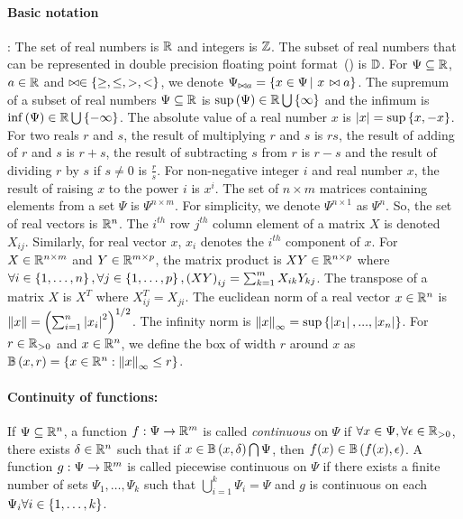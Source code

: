\paragraph{Basic notation}:  The set of real numbers is $\mathbb{R}$
and integers is $\mathbb{Z}$.  The subset of real
numbers that can be represented in double precision floating point
format~() is $\mathbb{D}$.  For $\Psi\subseteq\mathbb{R}$, $a\in\mathbb{R}$
and $\bowtie\in\left\{\geq,\leq,>,<\right\}$, we denote $\Psi_{\bowtie a}
= \left\{ x\in\Psi \left|~x\right. \bowtie a \right\}$.  The supremum of a subset of real
numbers $\Psi\subseteq\mathbb{R}$ is
$\sup\left(\Psi\right)\in\mathbb{R}\bigcup\left\{\infty\right\}$ and the infimum is
$\inf\left(\Psi\right)\in\mathbb{R}\bigcup\left\{-\infty\right\}$.  The absolute value of a
real number $x$ is $\left|x\right| = \sup\left\{x,-x\right\}$.  For two reals $r$ and
$s$, the result of multiplying $r$ and $s$ is $rs$, the result of
adding of $r$ and $s$ is $r+s$, the result of subtracting $s$ from $r$
is $r-s$ and the result of dividing $r$ by $s$ if $s\neq 0$ is
$\frac{r}{s}$.  For non-negative integer $i$ and real number $x$, the
result of raising $x$ to the power $i$ is $x^i$.  The set of $n\times
m$ matrices containing elements from a set $\Psi$ is $\Psi^{n\times
m}$.  For simplicity, we denote $\Psi^{n\times 1}$ as $\Psi^n$.  So,
the set of real vectors is $\mathbb{R}^n$. The $i^{th}$ row $j^{th}$
column element of a matrix $X$ is denoted $X_{ij}$.  Similarly, for
real vector $x$, $x_i$ denotes the $i^{th}$ component of $x$.  For
$X\in\mathbb{R}^{n\times m}$ and $Y\in\mathbb{R}^{m\times p}$, the matrix
product is $XY\in\mathbb{R}^{n\times p}$ where $\forall
i\in\left\{1,\ldots,n\right\},\forall j\in\left\{1,\ldots,p\right\},\left(XY\right)_{ij}
= \sum_{k=1}^{m}X_{ik}Y_{kj}$.  The transpose of a matrix $X$ is $X^T$
where $X^T_{ij} = X_{ji}$.  The euclidean norm of a real vector
$x\in\mathbb{R}^n$ is $\left\|x\right\| = \left(\sum_{i=1}^n\left|x_i\right|^2\right)^{1/2}$.
The infinity norm is $\left\|x\right\|_\infty
= \sup\left\{\left|x_1\right|,...,\left|x_n\right|\right\}$.  For $r\in\mathbb{R}_{> 0}$ and
$x\in\mathbb{R}^n$, we define the box of width $r$ around $x$ as
$\mathbb{B}\left(x,r\right) = \left\{ x\in\mathbb{R}^n: \left\|x\right\|_\infty \leq r \right\}$.
%
\paragraph{Continuity of functions:} If $\Psi\subseteq\mathbb{R}^n$, a
function $f:\Psi\rightarrow\mathbb{R}^m$ is called \emph{continuous} on
$\Psi$ if $\forall x\in\Psi,\forall\epsilon\in\mathbb{R}_{>0}$, there
exists $\delta\in\mathbb{R}^n$ such that if
$x\in\mathbb{B}\left(x,\delta\right)\bigcap\Psi$, then
$f(x)\in\mathbb{B}\left(f(x),\epsilon\right)$.  A function
$g:\Psi\rightarrow\mathbb{R}^m$ is called piecewise continuous on $\Psi$
if there exists a finite number of sets $\Psi_1,\ldots,\Psi_k$ such
that $\bigcup_{i=1}^k\Psi_i=\Psi$ and $g$ is continuous on each
$\Psi_i\forall i\in\left\{1,\ldots,k\right\}$.
%
